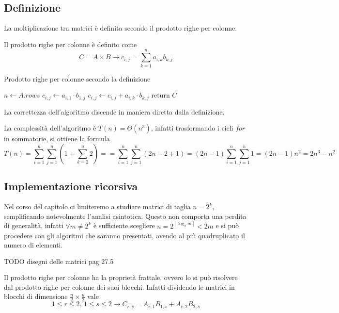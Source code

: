 \subsection{Definizione}
La moltiplicazione tra matrici è definita secondo il prodotto righe per colonne.
\begin{definition}
    Il prodotto righe per colonne è definito come
    \[
    C = A \times B \rightarrow
    c_{i,j} = \sum_{k=1}^{n}a_{i,k} b_{k,j}
    \]
    \label{def:prodrc}
\end{definition}
\begin{algorithm}[H]
\caption{Prodotto righe per colonne secondo la definizione}\label{alg:mulrcdef}
\begin{algorithmic}[1]
    \State $n \gets A.rows$
            \State $c_{i,j} \gets a_{i,1} \cdot b_{1,j} $
                \State $c_{i,j} \gets c_{i,j} + a_{i,k} \cdot b_{k,j} $
            \EndFor
        \EndFor
    \EndFor
    \State return $C$
\EndProcedure
\end{algorithmic}
\end{algorithm}
La correttezza dell'algoritmo discende in maniera diretta dalla definizione.

La complessità dell'algoritmo è $T(n) = \Theta (n^3)$, infatti trasformando i cicli $for$ in sommatorie, si ottiene la formula
\[
    T(n) = \sum_{i=1}^{n} \sum_{j=1}^{n} \left( 1 + \sum_{k=2}^{n} 2 \right) = 
    = \sum_{i=1}^{n} \sum_{j=1}^{n} \left( 2n-2+1 \right) 
    = \left( 2n-1 \right) \sum_{i=1}^{n} \sum_{j=1}^{n} 1 
    = (2n-1)n^2 = 2n^3 -n^2
\]

\subsection{Implementazione ricorsiva}
Nel corso del capitolo ci limiteremo a studiare matrici di taglia $n=2^k$, semplificando notevolmente l'analisi asintotica. Questo non comporta una perdita di generalità, infatti $\forall m \neq 2^k$ è sufficiente scegliere $n=2^{\left\lceil \log_2 m \right\rceil} < 2m$ e si può procedere con gli algoritmi che saranno presentati, avendo al più quadruplicato il numero di elementi.

TODO disegni delle matrici pag 27.5

Il prodotto righe per colonne ha la proprietà frattale, ovvero lo si può risolvere dal prodotto righe per colonne dei suoi blocchi.
Infatti dividendo le matrici in blocchi di dimensione $\frac{n}{2} \times \frac{n}{2}$ vale
\[
    1 \leq r \leq 2,\, 1 \leq s \leq 2 \rightarrow C_{r,s} = A_{r,1} B_{1,s} + A_{r,2} B_{2,s}
\]

